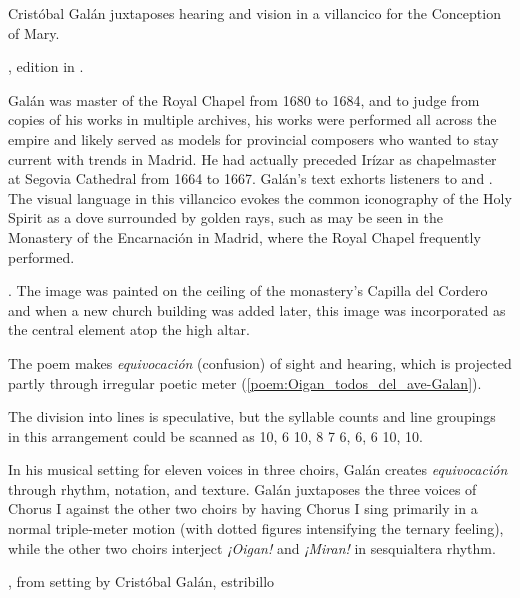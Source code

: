 Cristóbal Galán juxtaposes hearing and vision in a villancico for the Conception
of Mary.%
\begin{Footnote}
    , edition in \autocite[567--568]{CaberoPueyo:PhD}.
\end{Footnote}
Galán was master of the Royal Chapel from 1680 to 1684, and to judge from copies
of his works in multiple archives, his works were performed all across the
empire and likely served as models for provincial composers who wanted to stay
current with trends in Madrid.
He had actually preceded Irízar as chapelmaster at Segovia Cathedral from 1664
to 1667.%
    \Autocite{Baron-Sage:GalanC}
Galán's text exhorts listeners to  and .
The visual language in this villancico evokes the common iconography of the Holy
Spirit as a dove surrounded by golden rays, such as may be seen in the Monastery
of the Encarnación in Madrid, where the Royal Chapel frequently performed.%
\begin{Footnote}
    \Autocite[69--70, 81]{Sanz:GuiaDescalzasEncarnacion}.
    The image was painted on the ceiling of the monastery's Capilla del Cordero
    and when a new church building was added later, this image was incorporated
    as the central element atop the high altar.
\end{Footnote}
The poem makes \emph{equivocación} (confusion) of sight and hearing, which is
projected partly through irregular poetic meter
(\cref{poem:Oigan_todos_del_ave-Galan}).%
\begin{Footnote}
    The division into lines is speculative, but the syllable counts and line
    groupings in this arrangement could be scanned as  10, 6 10, 8 7 6, 6, 6 10,
    10.
\end{Footnote}
In his musical setting for eleven voices in three choirs, Galán creates
\emph{equivocación} through rhythm, notation, and texture.  
Galán juxtaposes the three voices of Chorus I against the other two choirs by
having Chorus I sing primarily in a normal triple-meter motion (with dotted
figures intensifying the ternary feeling), while the other two choirs interject
\emph{¡Oigan!} and \emph{¡Miran!} in sesquialtera rhythm.

\begin{poemexample}
    \caption{, from setting by Cristóbal Galán,
    estribillo}

    \label{poem:Oigan_todos_del_ave-Galan}

\end{poemexample}

